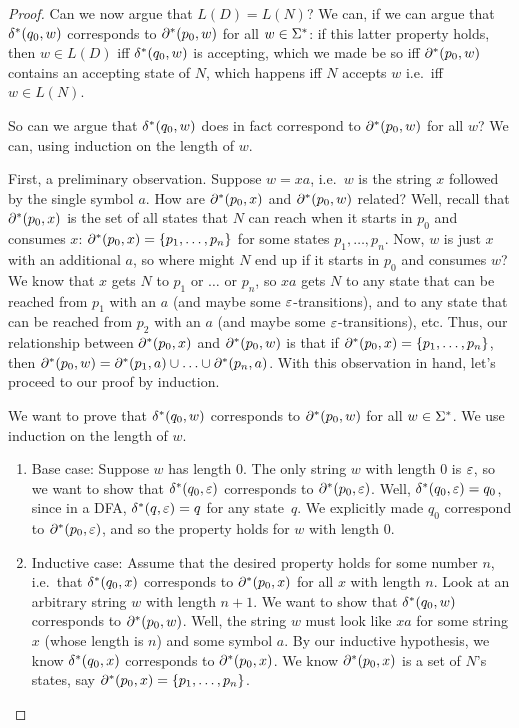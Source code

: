 \begin{proof}
Can we now argue that $L(D) = L(N)$?  We can, if we can argue that
$\delta^*(q_0,w)$ corresponds to $\partial^*(p_0,w)$ for all $w \in \Sigma^*$: if this
latter property holds, then $w \in L(D)$ iff $\delta^*(q_0,w)$ is accepting, which
we made be so iff $\partial^*(p_0,w)$ contains an accepting state of $N$, which
happens iff $N$ accepts $w$ i.e.\ iff $w \in L(N)$.

So can we argue that $\delta^*(q_0,w)$ does in fact correspond to $\partial^*(p_0,w)$
for all $w$?  We can, using induction on the length of $w$.

First, a preliminary observation.  Suppose $w=xa$, i.e.\ $w$ is the string $x$
followed by the single symbol $a$.  How are $\partial^*(p_0,x)$ and $\partial^*(p_0,w)$
related?  Well, recall that $\partial^*(p_0,x)$ is the set of all states that $N$ can
reach when it starts in $p_0$ and  consumes $x$: 
$\partial^*(p_0,x) = \{p_1, \ldots, p_n\}$ for some states
$p_1, \ldots, p_n$.  Now, $w$ is just $x$ with an additional $a$, so where might
$N$ end up if it starts in $p_0$ and  consumes $w$?  We know that $x$ gets $N$ to
$p_1$ or $\ldots$ or $p_n$, so $xa$ gets $N$ to any state that can be reached
from $p_1$ with an $a$ (and maybe some $\varepsilon$-transitions), and to any state
that can be reached from $p_2$ with an $a$ (and maybe some $\varepsilon$-transitions),
etc.  Thus, our relationship between $\partial^*(p_0,x)$ and $\partial^*(p_0,w)$ is that
if $\partial^*(p_0,x) = \{p_1, \ldots, p_n\}$, then $\partial^*(p_0,w) = \partial^*(p_1,a)
\cup \ldots \cup \partial^*(p_n,a)$.  With this observation in hand, let's proceed to
our proof by induction.

We want to prove that $\delta^*(q_0,w)$ corresponds to $\partial^*(p_0,w)$ for all
$w \in \Sigma^*$.  We use induction on the length of $w$.
\begin{enumerate}
\item Base case: Suppose $w$ has length 0.  The only string $w$ with length 0 is
$\varepsilon$, so we want to show that 
$\delta^*(q_0,\varepsilon)$ corresponds to $\partial^*(p_0,\varepsilon)$.  Well, 
$\delta^*(q_0, \varepsilon) = q_0$, since in a DFA, $\delta^*(q, \varepsilon) = q$ for any
state~$q$.  We explicitly made $q_0$ correspond to 
$\partial^*(p_0,\varepsilon)$, and so the property holds for $w$ with length 0.
\item Inductive case: Assume that the desired property holds for some number $n$,
i.e.\ that  $\delta^*(q_0,x)$ corresponds to $\partial^*(p_0,x)$ for all $x$ with
length $n$.  Look at an arbitrary string $w$ with length $n+1$.  
We want to show that $\delta^*(q_0,w)$ corresponds to $\partial^*(p_0,w)$.
Well, the string $w$
must look like $xa$ for some string $x$ (whose length is $n$) and some symbol
$a$.  By our inductive hypothesis, we know
$\delta^*(q_0,x)$ corresponds to $\partial^*(p_0,x)$.  We know $\partial^*(p_0,x)$ is a
set of $N$'s states, say 
$\partial^*(p_0,x) = \{p_1, \ldots, p_n\}$.


\end{enumerate}
\end{proof}

